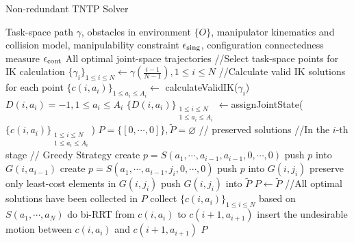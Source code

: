 \documentclass[letterpaper, 10 pt, conference]{ieeeconf}  %
\begin{document}
\begin{algorithm}[H]
    \caption{Non-redundant TNTP Solver}\label{alg:1}
    \begin{algorithmic}[1]
        \Require Task-space path $\gamma$, obstacles in environment $\{O\}$, manipulator kinematics and collision model, manipulability constraint $\epsilon_{\rm sing}$, configuration connectedness measure $\epsilon_{\rm cont}$
        \Ensure All optimal joint-space trajectories 
\State //Select task-space points for IK calculation
\State $\{\gamma_i\}_{1\leq i\leq N} \leftarrow \gamma(\frac{i-1}{N-1}), 1\leq i \leq N$
\State //Calculate valid IK solutions for each point
\State $\{c(i, a_i)\}_{1\leq a_i\leq A_i}\leftarrow$ calculateValidIK($\gamma_i$)
\State $D(i, a_i) = -1, 1\leq a_i\leq A_i$
\EndFor
\State $\{D(i, a_i)\}_{\substack{1\leq i\leq N\\1\leq a_i\leq A_i}}\leftarrow $assignJointState($\{c(i, a_i)\}_{\substack{1\leq i\leq N\\1\leq a_i\leq A_i}}$)
\State $P =\{[0, \cdots, 0]\}, \tilde{P} = \varnothing$ // preserved solutions
\State //In the $i$-th stage
\State // Greedy Strategy
\State create $p = S(a_1, \cdots, a_{i-1}, a_{i-1}, 0, \cdots, 0)$
\State push $p$ into $G(i, a_{i-1})$
\Else
{}
\State create $p = S(a_1, \cdots, a_{i-1}, j_i, 0, \cdots, 0)$
\State push $p$ into $G(i, j_i)$
\EndFor
\EndIf
\EndFor
{}
\State preserve only least-cost elements in $G(i, j_i)$
\State push $G(i, j_i)$ into $\tilde{P}$
\EndFor
\State $P \leftarrow \tilde{P}$
\EndFor
\State //All optimal solutions have been collected in $P$
\State collect $\{c(i, a_i)\}_{1\leq i\leq N}$ based on $S(a_1, \cdots, a_N)$
\State do bi-RRT from $c(i, a_i)$ to $c(i+1, a_{i+1})$ 
\State insert the undesirable motion between $c(i, a_i)$ and $c(i+1, a_{i+1})$
\EndIf
\EndFor
\EndFor
\State \Return $P$
    \end{algorithmic}  
\end{algorithm}
\end{document}
